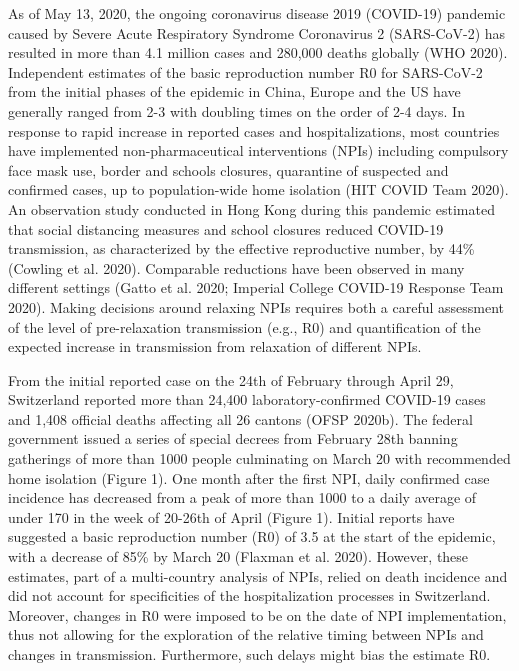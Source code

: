 As of May 13, 2020, the ongoing coronavirus disease 2019 (COVID-19) pandemic caused by Severe Acute Respiratory Syndrome Coronavirus 2 (SARS-CoV-2) has resulted in more than 4.1 million cases and 280,000 deaths globally (WHO 2020). Independent estimates of the basic reproduction number R0 for SARS-CoV-2 from the initial phases of the epidemic in China, Europe and the US have generally ranged from 2-3 with doubling times on the order of 2-4 days. In response to rapid increase in reported cases and hospitalizations, most countries have implemented non-pharmaceutical interventions (NPIs) including compulsory face mask use, border and schools closures, quarantine of suspected and confirmed cases, up to population-wide home isolation (HIT COVID Team 2020). An observation study conducted in Hong Kong during this pandemic estimated that social distancing measures and school closures reduced COVID-19 transmission, as characterized by the effective reproductive number, by 44\% (Cowling et al. 2020). Comparable reductions have been observed in many different settings (Gatto et al. 2020; Imperial College COVID-19 Response Team 2020). Making decisions around relaxing NPIs requires both a careful assessment of the level of pre-relaxation transmission (e.g., R0) and quantification of the expected increase in transmission from relaxation of different NPIs.

From the initial reported case on the 24th of February through April 29, Switzerland reported more than 24,400 laboratory-confirmed COVID-19 cases and 1,408 official deaths affecting all 26 cantons (OFSP 2020b). The federal government issued a series of special decrees from February 28th banning gatherings of more than 1000 people culminating on March 20 with recommended home isolation (Figure 1). One month after the first NPI, daily confirmed case incidence has decreased from a peak of more than 1000 to a daily average of under 170 in the week of 20-26th of April (Figure 1). Initial reports have suggested a basic reproduction number (R0) of 3.5 at the start of the epidemic, with a decrease of 85\% by March 20 (Flaxman et al. 2020). However, these estimates, part of a multi-country analysis of NPIs, relied on death incidence and did not account for specificities of the hospitalization processes in Switzerland. Moreover, changes in R0 were imposed to be on the date of NPI implementation, thus not allowing for the exploration of the relative timing between NPIs and changes in transmission. Furthermore, such delays might bias the estimate R0.

